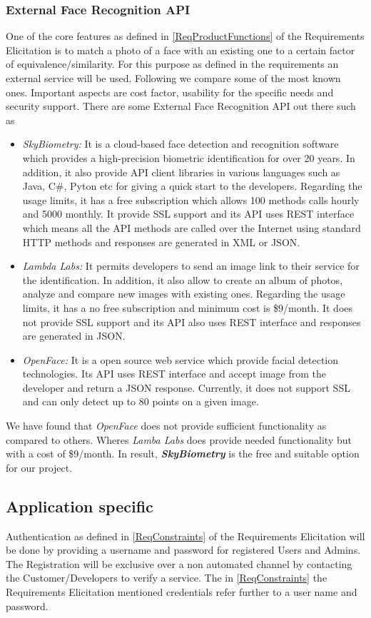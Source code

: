 \documentclass[a4paper,11pt]{article}
\begin{document}
\subsubsection{External Face Recognition API}
One of the core features as defined in \ref{ReqProductFunctions} of the Requirements Elicitation is to match a photo of a face with an existing one to a certain factor of equivalence/similarity. For this purpose as defined in the requirements an external service will be used. Following we compare some of the most known ones. Important aspects are cost factor, usability for the specific needs and security support.
There are some External Face Recognition API out there such as
\begin{itemize}
\item \emph{SkyBiometry: } It is a cloud-based face detection and recognition software which provides a high-precision biometric identification for over 20 years. In addition, it also provide API client libraries in various languages such as Java, C\#, Pyton etc for giving a quick start to the developers. Regarding the usage limits, it has a free subscription which allows 100 methods calls hourly and 5000 monthly. It provide SSL support and its API uses REST interface which means all the API methods are called over the Internet using standard HTTP methods and responses are generated in XML or JSON.
\item \emph{Lambda Labs: } It permits developers to send an image link to their service for the identification. In addition, it also allow to create an album of photos, analyze and compare new images with existing ones. Regarding the usage limits, it has a no free subscription and minimum cost is \$9/month. It does not provide SSL support and its API also uses REST interface and responses are generated in JSON.
\item \emph{OpenFace: } It is a open source web service which provide facial detection technologies. Its API uses REST interface and accept image from the developer and return a JSON response. Currently, it does not support SSL and can only detect up to 80 points on a given image.
\end{itemize}
We have found that \emph{OpenFace} does not provide sufficient functionality as compared to others. Wheres \emph{Lamba Labs} does provide needed functionality but with a cost of \$9/month. In result, \emph{\textbf{SkyBiometry}} is the free and suitable option for our project.

\subsection{Application specific}
Authentication as defined in \ref{ReqConstraints} of the Requirements Elicitation will be done by providing a username and password for registered Users and Admins. The Registration will be exclusive over  a non automated channel by contacting the Customer/Developers to verify a service. The in \ref{ReqConstraints} the Requirements Elicitation mentioned credentials refer further to a user name and password.
\end{document}
